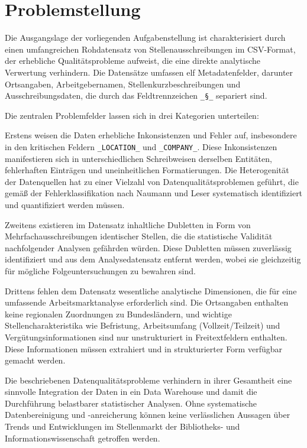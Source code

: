 \documentclass[
    a4paper,
    12pt,
    headinclude=true,
    BCOR=10mm,
]{scrreprt}
\begin{document}
\section{Problemstellung}

Die Ausgangslage der vorliegenden Aufgabenstellung ist charakterisiert durch einen umfangreichen Rohdatensatz von Stellenausschreibungen im CSV-Format, der erhebliche Qualitätsprobleme aufweist, die eine direkte analytische Verwertung verhindern. Die Datensätze umfassen elf Metadatenfelder, darunter Ortsangaben, Arbeitgebernamen, Stellenkurzbeschreibungen und Ausschreibungsdaten, die durch das Feldtrennzeichen \texttt{\_§\_} separiert sind.

Die zentralen Problemfelder lassen sich in drei Kategorien unterteilen:

Erstens weisen die Daten erhebliche Inkonsistenzen und Fehler auf, insbesondere in den kritischen Feldern \texttt{\_LOCATION\_} und \texttt{\_COMPANY\_}. Diese Inkonsistenzen manifestieren sich in unterschiedlichen Schreibweisen derselben Entitäten, fehlerhaften Einträgen und uneinheitlichen Formatierungen. Die Heterogenität der Datenquellen hat zu einer Vielzahl von Datenqualitätsproblemen geführt, die gemäß der Fehlerklassifikation nach Naumann und Leser systematisch identifiziert und quantifiziert werden müssen.

Zweitens existieren im Datensatz inhaltliche Dubletten in Form von Mehrfachausschreibungen identischer Stellen, die die statistische Validität nachfolgender Analysen gefährden würden. Diese Dubletten müssen zuverlässig identifiziert und aus dem Analysedatensatz entfernt werden, wobei sie gleichzeitig für mögliche Folgeuntersuchungen zu bewahren sind.

Drittens fehlen dem Datensatz wesentliche analytische Dimensionen, die für eine umfassende Arbeitsmarktanalyse erforderlich sind. Die Ortsangaben enthalten keine regionalen Zuordnungen zu Bundesländern, und wichtige Stellencharakteristika wie Befristung, Arbeitsumfang (Vollzeit/Teilzeit) und Vergütungsinformationen sind nur unstrukturiert in Freitextfeldern enthalten. Diese Informationen müssen extrahiert und in strukturierter Form verfügbar gemacht werden.

Die beschriebenen Datenqualitätsprobleme verhindern in ihrer Gesamtheit eine sinnvolle Integration der Daten in ein Data Warehouse und damit die Durchführung belastbarer statistischer Analysen. Ohne systematische Datenbereinigung und -anreicherung können keine verlässlichen Aussagen über Trends und Entwicklungen im Stellenmarkt der Bibliotheks- und Informationswissenschaft getroffen werden.
\end{document}
